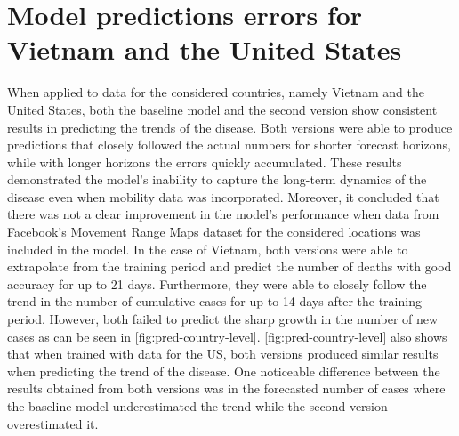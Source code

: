 \section{Model predictions errors for Vietnam and the United States}

When applied to data for the considered countries, namely Vietnam and the United States, both the baseline model and the second version show consistent results in predicting the trends of the disease.
Both versions were able to produce predictions that closely followed the actual numbers for shorter forecast horizons, while with longer horizons the errors quickly accumulated.
These results demonstrated the model's inability to capture the long-term dynamics of the disease even when mobility data was incorporated.
Moreover, it concluded that there was not a clear improvement in the model's performance when data from Facebook's Movement Range Maps dataset for the considered locations was included in the model.
In the case of Vietnam, both versions were able to extrapolate from the training period and predict the number of deaths with good accuracy for up to 21 days.
Furthermore, they were able to closely follow the trend in the number of cumulative cases for up to 14 days after the training period.
However, both failed to predict the sharp growth in the number of new cases as can be seen in \autoref{fig:pred-country-level}.
\autoref{fig:pred-country-level} also shows that when trained with data for the \gls{US}, both versions produced similar results when predicting the trend of the disease.
One noticeable difference between the results obtained from both versions was in the forecasted number of cases where the baseline model underestimated the trend while the second version overestimated it.


